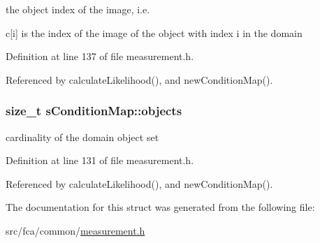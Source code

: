 the object index of the image, i.\-e. 

c\mbox{[}i\mbox{]} is the index of the image of the object with index i in the domain 

\-Definition at line 137 of file measurement.\-h.



\-Referenced by calculate\-Likelihood(), and new\-Condition\-Map().

\hypertarget{structsConditionMap_aba0e3734a3c3c6de4f39d9a6c72f3cca}{
\subsubsection[{objects}]{\setlength{\rightskip}{0pt plus 5cm}size\-\_\-t {\bf s\-Condition\-Map\-::objects}}}\label{structsConditionMap_aba0e3734a3c3c6de4f39d9a6c72f3cca}


cardinality of the domain object set 



\-Definition at line 131 of file measurement.\-h.



\-Referenced by calculate\-Likelihood(), and new\-Condition\-Map().



\-The documentation for this struct was generated from the following file\-:\begin{DoxyCompactItemize}
\item 
src/fca/common/\hyperlink{common_2measurement_8h}{measurement.\-h}\end{DoxyCompactItemize}

